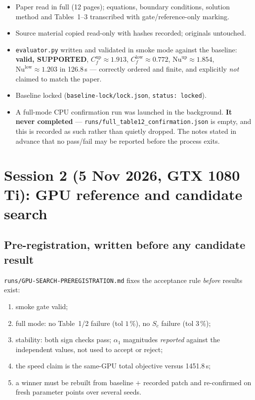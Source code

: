 \documentclass[11pt,a4paper]{article}
\newcommand{\code}[1]{\texttt{\small #1}}
\newcommand{\pct}{\,\%}
\begin{document}
\begin{itemize}[leftmargin=1.4em,itemsep=1pt]
  \item Paper read in full (12 pages); equations, boundary conditions, solution method and
        Tables~1--3 transcribed with gate/reference-only marking.
  \item Source material copied read-only with hashes recorded; originals untouched.
  \item \code{evaluator.py} written and validated in smoke mode against the baseline:
        \textbf{valid, SUPPORTED}, $C_f^{\mathrm{up}}{\approx}1.913$,
        $C_f^{\mathrm{low}}{\approx}0.772$, $\mathrm{Nu}^{\mathrm{up}}{\approx}1.854$,
        $\mathrm{Nu}^{\mathrm{low}}{\approx}1.203$ in 126.8\,s --- correctly ordered and
        finite, and explicitly \emph{not} claimed to match the paper.
  \item Baseline locked (\code{baseline-lock/lock.json}, \code{status: locked}).
  \item A full-mode CPU confirmation run was launched in the background. \textbf{It never
        completed} --- \code{runs/full\_table12\_confirmation.json} is empty, and this is
        recorded as such rather than quietly dropped. The notes stated in advance that no
        pass/fail may be reported before the process exits.
\end{itemize}

\section{Session 2 (5 Nov 2026, GTX 1080 Ti): GPU reference and candidate search}

\subsection{Pre-registration, written before any candidate result}
\code{runs/GPU-SEARCH-PREREGISTRATION.md} fixes the acceptance rule \emph{before} results
exist:
\begin{enumerate}[leftmargin=1.4em,itemsep=1pt]
  \item smoke gate valid;
  \item full mode: no Table~1/2 failure (tol $1\pct$), no $S_c$ failure (tol $3\pct$);
  \item stability: both sign checks pass; $\alpha_1$ magnitudes \emph{reported} against the
        independent values, not used to accept or reject;
  \item the speed claim is the same-GPU total objective versus 1451.8\,s;
  \item a winner must be rebuilt from baseline $+$ recorded patch and re-confirmed on fresh
        parameter points over several seeds.
\end{enumerate}
\end{document}
